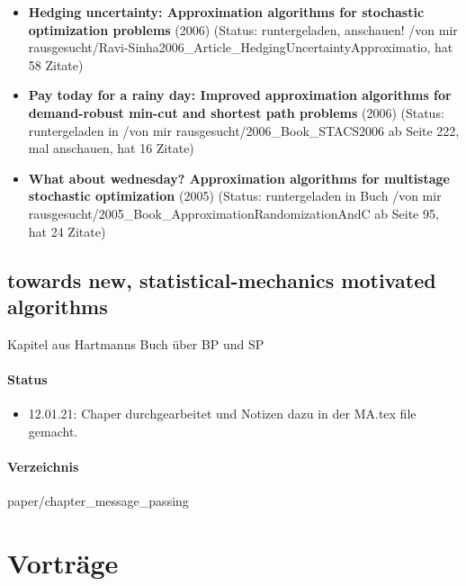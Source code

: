 \documentclass[paper=a4,10pt]{scrartcl}
\begin{document}
\begin{itemize}
\item  \textbf{Hedging uncertainty: Approximation algorithms for stochastic optimization problems} (2006) (Status: runtergeladen, anschauen! /von mir rausgesucht/Ravi-Sinha2006\_Article\_HedgingUncertaintyApproximatio, hat 58 Zitate)
\item  \textbf{Pay today for a rainy day: Improved approximation algorithms for demand-robust min-cut and shortest path problems} (2006) (Status: runtergeladen in /von mir rausgesucht/2006\_Book\_STACS2006 ab Seite 222, mal anschauen, hat 16 Zitate)
\item  \textbf{What about wednesday? Approximation algorithms for multistage stochastic optimization} (2005) (Status: runtergeladen in Buch /von mir rausgesucht/2005\_Book\_ApproximationRandomizationAndC ab Seite 95, hat 24 Zitate)
\end{itemize}

\subsection{towards new, statistical-mechanics motivated algorithms}
Kapitel aus Hartmanns Buch über BP und SP

\paragraph{Status}
\begin{itemize}
\item 12.01.21: Chaper durchgearbeitet und Notizen dazu in der MA.tex file gemacht.
\end{itemize}
\paragraph{Verzeichnis} paper/chapter\_message\_passing

\section{Vorträge}
\end{document}
